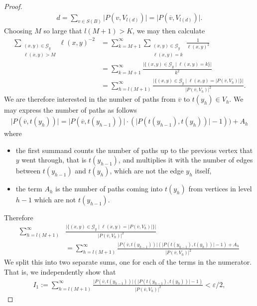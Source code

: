 \documentclass[11pt,a4paper,oneside,final,reqno]{amsart}
\theoremstyle{definition}
\newcommand{\G}{\mathcal{G}}
\numberwithin{equation}{section}
\begin{document}
\begin{proof}
\begin{align*}
			d = \sum_{v \in S(B)} \vert P(v, V_{l(d)})\vert = \vert P(\overline{v} , V_{l(d)}) \vert.
		\end{align*}
		Choosing $M$ so large that $l(M+1) > K$, we may then calculate
		\begin{align*}
			\sum_{\substack{(x,y)\in \G_y \\ \ell(x,y) > M}} \ell(x,y)^{-2} &= \sum_{k = M+1}^\infty \sum_{\substack{(x,y)\in \G_y \\ \ell(x,y) = k}} \frac{1}{\ell(x,y)^2} \\ 
			&= \sum_{k = M+1}^\infty \frac{\vert \{ (x,y) \in \G_y \mid \ell(x,y) = k  \}\vert}{k^2} \\
			&= \sum_{h = l(M+1)}^{\infty} \frac{\vert \{ (x,y)\in \G_y \mid \ell(x,y) =\vert P(\overline{v} , V_{h}) \vert \}\vert}{\vert P(\overline{v} , V_{h}) \vert^2}.
		\end{align*}
		We are therefore interested in the number of paths from $\overline{v}$ to $t(y_h) \in V_h$. 
		We may express the number of paths as follows
		\begin{align*}
			\vert P(\overline{v}, t(y_{h})) \vert = \vert P(\overline{v}, t(y_{h-1}))\vert \cdot ( \vert P(t(y_{h-1}), t(y_{h})) \vert -1 )  ) +A_h
		\end{align*}
		where
		\begin{itemize}
			\item the first summand counts the number of paths up to the previous vertex that $y$ went through, that is $t(y_{h-1})$, and multiplies it with the number of edges between $t(y_{h-1})$ and $t(y_{h})$, which are not the edge $y_{h}$ itself,
			\item the term $A_h$ is the number of paths coming into $t(y_h)$ from vertices in level $h-1$ which are not $t(y_{h-1})$. 
		\end{itemize}
		Therefore
		\begin{align*}
			\sum_{h = l(M+1)}^{\infty}& \frac{\vert \{ (x,y)\in \G_y \mid \ell(x,y) = \vert P(\overline{v}, V_h) \vert \}\vert}{\vert P(\overline{v}, V_h) \vert^2} \\
			&= \sum_{h = l(M+1)}^{\infty} \frac{ \vert P(\overline{v}, t(y_{h-1}))\vert ( \vert P(t(y_{h-1}), t(y_{h})) \vert -1   ) + A_h}{\vert P(\overline{v} , V_h) \vert^2}
		\end{align*}
		We split this into two separate sums, one for each of the terms in the numerator. That is, we independently show that 
		\begin{align*}
			I_1 := \sum_{h = l(M+1)}^{\infty} \frac{ \vert P(\overline{v}, t(y_{h-1}))\vert ( \vert P(t(y_{h-1}), t(y_{h})) \vert -1 )   }{\vert P(\overline{v} , V_h) \vert^2} < \varepsilon/2,

\end{align*}
\end{proof}
\end{document}
